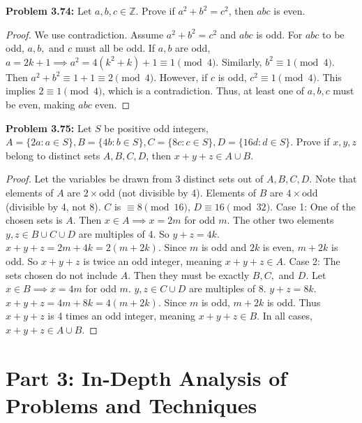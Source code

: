\documentclass[11pt, letterpaper]{article}
\theoremstyle{definition}
\theoremstyle{remark}
\newcommand{\Z}{\mathbb{Z}}
\begin{document}
\textbf{Problem 3.74:} Let $a,b,c \in \Z$. Prove if $a^2+b^2=c^2$, then $abc$ is even.
\begin{proof}
We use contradiction. Assume $a^2+b^2=c^2$ and $abc$ is odd.
For $abc$ to be odd, $a, b,$ and $c$ must all be odd.
If $a,b$ are odd, $a = 2k+1 \implies a^2 = 4(k^2+k)+1 \equiv 1 \pmod 4$.
Similarly, $b^2 \equiv 1 \pmod 4$.
Then $a^2 + b^2 \equiv 1 + 1 \equiv 2 \pmod 4$.
However, if $c$ is odd, $c^2 \equiv 1 \pmod 4$.
This implies $2 \equiv 1 \pmod 4$, which is a contradiction. 
Thus, at least one of $a,b,c$ must be even, making $abc$ even.
\end{proof}

\textbf{Problem 3.75:} Let $S$ be positive odd integers, $A=\{2a: a \in S\}, B=\{4b: b \in S\}, C=\{8c: c \in S\}, D=\{16d: d \in S\}$. Prove if $x,y,z$ belong to distinct sets $A,B,C,D$, then $x+y+z \in A \cup B$.
\begin{proof}
Let the variables be drawn from 3 distinct sets out of $A,B,C,D$. Note that elements of $A$ are $2 \times \text{odd}$ (not divisible by 4). Elements of $B$ are $4 \times \text{odd}$ (divisible by 4, not 8). $C$ is $\equiv 8 \pmod{16}$, $D \equiv 16 \pmod{32}$.
Case 1: One of the chosen sets is $A$. Then $x \in A \implies x = 2m$ for odd $m$. The other two elements $y,z \in B \cup C \cup D$ are multiples of 4. So $y+z = 4k$.
$x+y+z = 2m + 4k = 2(m+2k)$. Since $m$ is odd and $2k$ is even, $m+2k$ is odd. So $x+y+z$ is twice an odd integer, meaning $x+y+z \in A$.
Case 2: The sets chosen do not include $A$. Then they must be exactly $B, C,$ and $D$.
Let $x \in B \implies x = 4m$ for odd $m$. $y,z \in C \cup D$ are multiples of 8. $y+z = 8k$.
$x+y+z = 4m + 8k = 4(m+2k)$. Since $m$ is odd, $m+2k$ is odd. Thus $x+y+z$ is 4 times an odd integer, meaning $x+y+z \in B$.
In all cases, $x+y+z \in A \cup B$.
\end{proof}


\newpage

\section{Part 3: In-Depth Analysis of Problems and Techniques}
\end{document}
